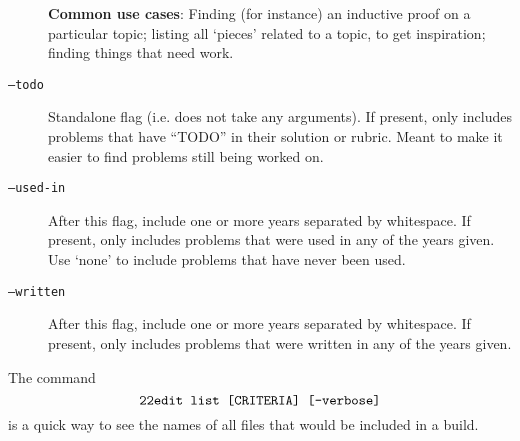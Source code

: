 \begin{description}
        \textbf{Common use cases}: Finding (for instance) an inductive proof 
        on a particular topic; listing all `pieces' related to a topic, to get
        inspiration; finding things that need work.
      \item[\texttt{--todo}] 
        Standalone flag (i.e. does not take any arguments). If present, only 
        includes problems that have ``TODO'' in their 
        solution or rubric. Meant to make it easier to find problems still 
        being worked on.
      \item[\texttt{--used-in}] 
        After this flag, include one or more years separated by whitespace.
        If present, only includes problems that were used in any of the years 
        given. Use `none' to include problems that have never been used. 
      \item[\texttt{--written}] 
        After this flag, include one or more years separated by whitespace. 
        If present, only includes problems that were written in any of the 
        years given.
    \end{description}
    
  The command \[\texttt{\texttt{22edit }list [CRITERIA] [--verbose]}\] is a quick way to
  see the names of all files that would be included in a build.